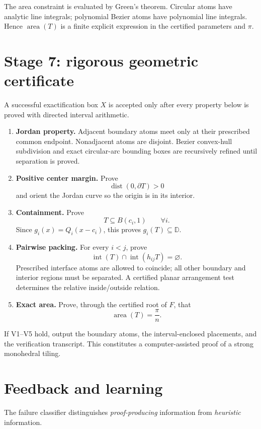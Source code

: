 \documentclass[11pt]{article}
\newcommand{\D}{\mathbb D}
\newcommand{\area}{\operatorname{area}}
\newcommand{\interior}{\operatorname{int}}
\newcommand{\dist}{\operatorname{dist}}
\begin{document}
The area constraint is evaluated by Green's theorem. Circular atoms have analytic line integrals; polynomial Bezier atoms have polynomial line integrals. Hence $\area(T)$ is a finite explicit expression in the certified parameters and $\pi$.

\section{Stage 7: rigorous geometric certificate}

A successful exactification box $X$ is accepted only after every property below is proved with directed interval arithmetic.

\begin{enumerate}[label=\textbf{V\arabic*.},leftmargin=16mm]
\item \textbf{Jordan property.} Adjacent boundary atoms meet only at their prescribed common endpoint. Nonadjacent atoms are disjoint. Bezier convex-hull subdivision and exact circular-arc bounding boxes are recursively refined until separation is proved.
\item \textbf{Positive center margin.} Prove
\[
\dist(0,\partial T)>0
\]
and orient the Jordan curve so the origin is in its interior.
\item \textbf{Containment.} Prove
\[
T\subseteq B(c_i,1)
\qquad \forall i.
\]
Since $g_i(x)=Q_i(x-c_i)$, this proves $g_i(T)\subseteq\D$.
\item \textbf{Pairwise packing.} For every $i<j$, prove
\[
\interior(T)\cap\interior(h_{ij}T)=\varnothing.
\]
Prescribed interface atoms are allowed to coincide; all other boundary and interior regions must be separated. A certified planar arrangement test determines the relative inside/outside relation.
\item \textbf{Exact area.} Prove, through the certified root of $F$, that
\[
\area(T)=\frac{\pi}{n}.
\]
\end{enumerate}

If V1--V5 hold, output the boundary atoms, the interval-enclosed placements, and the verification transcript. This constitutes a computer-assisted proof of a strong monohedral tiling.

\section{Feedback and learning}

The failure classifier distinguishes \emph{proof-producing} information from \emph{heuristic} information.
\end{document}
